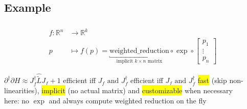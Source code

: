 \documentclass[aspectratio=169,xcolor=dvipsnames]{beamer}
\begin{document}
\subsection{Example}
\begin{frame}
	\frametitle{\insertsection}
	\framesubtitle{\insertsubsection}

	\begin{align*}
		f : \mathbb{R}^{n} &\rightarrow \mathbb{R}^k
		\\ p &\mapsto
		f(p) =
		\underbracket{\text{weighted\_reduction}}_{\text{implicit $k \times n$ matrix}}
		\circ
		\exp
		\circ
		\begin{bmatrix}
			p_{1} \\
			\vdots \\
			p_{n}
		\end{bmatrix}
	\end{align*}

	\pause
	\vspace{1em}
	\begin{center}
		$\partial^\dagger \partial H\approx J_{f}^\dagger \widehat{\tilde{L}} J_{f} + 1$ efficient iff $J_f \text{ and } J^\dagger_f$ efficient iff $J_f \text{ and } J^\dagger_f$ \colorbox{yellow}{fast} (skip non-linearities), \colorbox{yellow}{implicit} (no actual matrix) and \colorbox{yellow}{customizable} when necessary
		\vspace{0.5em}
		\\ here: no $\exp$ and always compute weighted reduction on the fly
	\end{center}

\end{frame}
\end{document}
